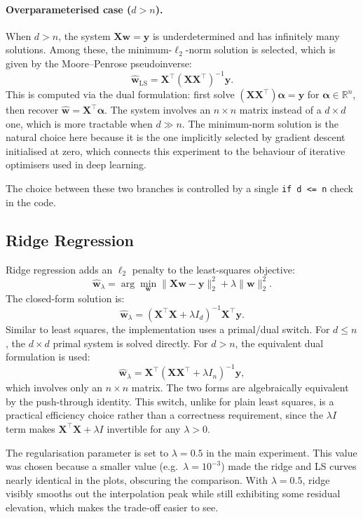 \documentclass[11pt,a4paper]{article}
\begin{document}
\paragraph{Overparameterised case ($d > n$).} When $d > n$, the system $\mathbf{X}\mathbf{w} = \mathbf{y}$ is underdetermined and has infinitely many solutions. Among these, the minimum-$\ell_2$-norm solution is selected, which is given by the Moore--Penrose pseudoinverse:
\[
    \hat{\mathbf{w}}_{\text{LS}} = \mathbf{X}^\top (\mathbf{X} \mathbf{X}^\top)^{-1} \mathbf{y}.
\]
This is computed via the dual formulation: first solve $(\mathbf{X}\mathbf{X}^\top)\boldsymbol{\alpha} = \mathbf{y}$ for $\boldsymbol{\alpha} \in \mathbb{R}^n$, then recover $\hat{\mathbf{w}} = \mathbf{X}^\top \boldsymbol{\alpha}$. The system involves an $n \times n$ matrix instead of a $d \times d$ one, which is more tractable when $d \gg n$. The minimum-norm solution is the natural choice here because it is the one implicitly selected by gradient descent initialised at zero, which connects this experiment to the behaviour of iterative optimisers used in deep learning.

The choice between these two branches is controlled by a single \texttt{if d <= n} check in the code.

\subsection{Ridge Regression}

Ridge regression adds an $\ell_2$ penalty to the least-squares objective:
\[
    \hat{\mathbf{w}}_\lambda = \arg\min_{\mathbf{w}} \|\mathbf{X}\mathbf{w} - \mathbf{y}\|_2^2 + \lambda \|\mathbf{w}\|_2^2.
\]
The closed-form solution is:
\[
    \hat{\mathbf{w}}_\lambda = (\mathbf{X}^\top \mathbf{X} + \lambda I_d)^{-1} \mathbf{X}^\top \mathbf{y}.
\]
Similar to least squares, the implementation uses a primal/dual switch. For $d \leq n$, the $d \times d$ primal system is solved directly. For $d > n$, the equivalent dual formulation is used:
\[
    \hat{\mathbf{w}}_\lambda = \mathbf{X}^\top (\mathbf{X} \mathbf{X}^\top + \lambda I_n)^{-1} \mathbf{y},
\]
which involves only an $n \times n$ matrix. The two forms are algebraically equivalent by the push-through identity. This switch, unlike for plain least squares, is a practical efficiency choice rather than a correctness requirement, since the $\lambda I$ term makes $\mathbf{X}^\top\mathbf{X} + \lambda I$ invertible for any $\lambda > 0$.

The regularisation parameter is set to $\lambda = 0.5$ in the main experiment. This value was chosen because a smaller value (e.g.\ $\lambda = 10^{-3}$) made the ridge and LS curves nearly identical in the plots, obscuring the comparison. With $\lambda = 0.5$, ridge visibly smooths out the interpolation peak while still exhibiting some residual elevation, which makes the trade-off easier to see.
\end{document}
